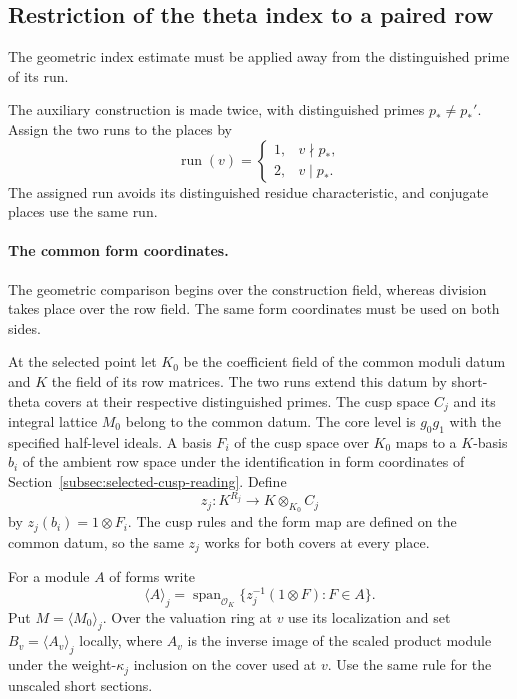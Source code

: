 \subsection{Restriction of the theta index to a paired row}
\label{subsec:paired-row-indices}
\hypertarget{source-paired-row-indices}{}

The geometric index estimate must be applied away from the distinguished prime of its run.

The auxiliary construction is made twice, with distinguished primes
\(p_*\ne p_*'\). Assign the two runs to the places by
\[
 \operatorname{run}(v)=\begin{cases}1,&v\nmid p_*,\\2,&v\mid p_*.\end{cases}
\]
The assigned run avoids its distinguished residue characteristic, and conjugate places use the same run.

\paragraph{The common form coordinates.}
\label{par:selected-form-coordinates}

The geometric comparison begins over the construction field, whereas division takes place over the row field. The same form coordinates must be used on both sides.

At the selected point let \(K_0\) be the coefficient field of the
common moduli datum and \(K\) the field of its row matrices. The
two runs extend this datum by short-theta covers at their
respective distinguished primes. The cusp space \(C_j\) and its
integral lattice \(M_0\) belong to the common datum. The core
level is \(g_0g_1\) with the specified half-level ideals.
A basis \(F_i\) of the cusp space over \(K_0\) maps to a \(K\)-basis \(b_i\) of the ambient row space under the identification in form coordinates
of Section~\ref{subsec:selected-cusp-reading}. Define
\[
       z_j:K^{R_j}\longrightarrow K\otimes_{K_0}C_j
\]
by \(z_j(b_i)=1\otimes F_i\). The cusp rules and the form map
are defined on the common datum, so the same \(z_j\) works
for both covers at every place.

\begin{definition}\label{def:common-row-lattices}
For a module \(A\) of forms write
\[
 \langle A\rangle_j=\operatorname{span}_{\mathcal O_K}
            \{z_j^{-1}(1\otimes F):F\in A\}.
\]
Put \(M=\langle M_0\rangle_j\). Over the valuation ring at \(v\)
use its localization and set \(B_v=\langle A_v\rangle_j\) locally,
where \(A_v\) is the inverse image of the scaled product module
under the weight-\(\kappa_j\) inclusion on the cover used at \(v\).
Use the same rule for the unscaled short sections.
\end{definition}

